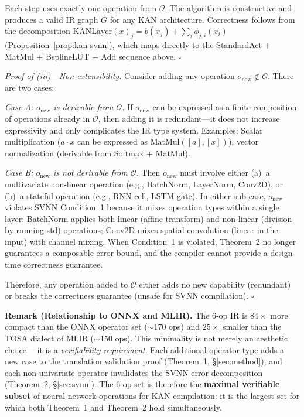 \vspace{4pt}
\noindent Each step uses exactly one operation from $\mathcal{O}$. The
algorithm is constructive and produces a valid IR graph $G$ for any KAN
architecture. Correctness follows from the decomposition
$\text{KANLayer}(x)_j = b(x_j) + \sum_i \phi_{j,i}(x_i)$
(Proposition~\ref{prop:kan-svnn}), which maps directly to the
StandardAct + MatMul + BsplineLUT + Add sequence above.
$\square$

\vspace{4pt}
\noindent\textit{Proof of (iii)---Non-extensibility.}
Consider adding any operation $o_{\text{new}} \notin \mathcal{O}$.
There are two cases:

\vspace{2pt}
\noindent\textit{Case A: $o_{\text{new}}$ is derivable from $\mathcal{O}$.}
If $o_{\text{new}}$ can be expressed as a finite composition of
operations already in $\mathcal{O}$, then adding it is redundant---it
does not increase expressivity and only complicates the IR type system.
Examples: Scalar multiplication ($a \cdot x$ can be expressed as
$\text{MatMul}([a], [x])$), vector normalization (derivable from
Softmax + MatMul).

\vspace{2pt}
\noindent\textit{Case B: $o_{\text{new}}$ is not derivable from $\mathcal{O}$.}
Then $o_{\text{new}}$ must involve either (a)~a multivariate non-linear
operation (e.g., BatchNorm, LayerNorm, Conv2D), or (b)~a stateful
operation (e.g., RNN cell, LSTM gate). In either sub-case,
$o_{\text{new}}$ violates SVNN Condition~1 because it mixes
operation types within a single layer: BatchNorm applies both
linear (affine transform) and non-linear (division by running std)
operations; Conv2D mixes spatial convolution (linear in the input)
with channel mixing. When Condition~1 is violated, Theorem~2 no
longer guarantees a composable error bound, and the compiler cannot
provide a design-time correctness guarantee.

Therefore, any operation added to $\mathcal{O}$ either adds no new
capability (redundant) or breaks the correctness guarantee
(unsafe for SVNN compilation). $\square$

\vspace{4pt}
\noindent\textbf{Remark (Relationship to ONNX and MLIR).}
The 6-op IR is $84\times$ more compact than the ONNX operator set
($\sim$170 ops) and $25\times$ smaller than the TOSA dialect of MLIR
($\sim$150 ops). This minimality is not merely an aesthetic choice---
it is a \textit{verifiability requirement}. Each additional operator
type adds a new case to the translation validation proof (Theorem~1,
{\S}\ref{sec:method}), and each non-univariate operator invalidates
the SVNN error decomposition (Theorem~2, {\S}\ref{sec:svnn}). The
6-op set is therefore the \textbf{maximal verifiable subset} of
neural network operations for KAN compilation: it is the largest
set for which both Theorem~1 and Theorem~2 hold simultaneously.
